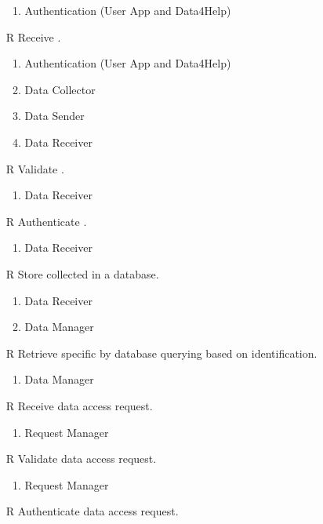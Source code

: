 \begin{itemize}
	\begin{enumerate}
		\item Authentication (User App and Data4Help)
	\end{enumerate}
	\item[R\subs{8}]Receive .
	\begin{enumerate}
		\item Authentication (User App and Data4Help)
		\item Data Collector
		\item Data Sender
		\item Data Receiver
	\end{enumerate}
	\item[R\subs{9}]Validate .
	\begin{enumerate}
		\item Data Receiver
	\end{enumerate}
	\item[R\subs{10}]Authenticate .
	\begin{enumerate}
		\item Data Receiver
	\end{enumerate}
	\item[R\subs{11}]Store collected  in a database.
	\begin{enumerate}
		\item Data Receiver
		\item Data Manager
	\end{enumerate}
	\item[R\subs{12}]Retrieve specific  by database querying based on  identification.
	\begin{enumerate}
		\item Data Manager
	\end{enumerate}
	\item[R\subs{13}]Receive  data access request.
	\begin{enumerate}
		\item Request Manager
	\end{enumerate}
	\item[R\subs{14}]Validate  data access request.
	\begin{enumerate}
		\item Request Manager
	\end{enumerate}
	\item[R\subs{15}]Authenticate  data access request.
	\begin{enumerate}

\end{enumerate}
\end{itemize}
